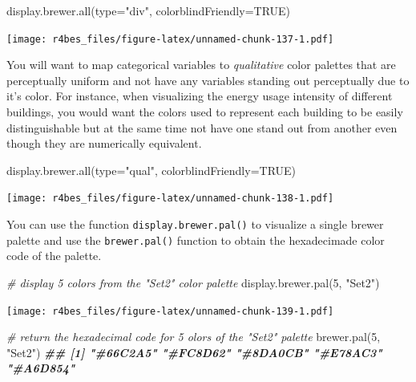 \documentclass[
]{book}
\newenvironment{Shaded}{\begin{snugshade}}{\end{snugshade}}
\newcommand{\AttributeTok}[1]{\textcolor[rgb]{0.77,0.63,0.00}{#1}}
\newcommand{\CommentTok}[1]{\textcolor[rgb]{0.56,0.35,0.01}{\textit{#1}}}
\newcommand{\ConstantTok}[1]{\textcolor[rgb]{0.00,0.00,0.00}{#1}}
\newcommand{\DecValTok}[1]{\textcolor[rgb]{0.00,0.00,0.81}{#1}}
\newcommand{\DocumentationTok}[1]{\textcolor[rgb]{0.56,0.35,0.01}{\textbf{\textit{#1}}}}
\newcommand{\FunctionTok}[1]{\textcolor[rgb]{0.00,0.00,0.00}{#1}}
\newcommand{\NormalTok}[1]{#1}
\newcommand{\StringTok}[1]{\textcolor[rgb]{0.31,0.60,0.02}{#1}}
\begin{document}
\begin{Shaded}
\begin{Highlighting}[]
\FunctionTok{display.brewer.all}\NormalTok{(}\AttributeTok{type=}\StringTok{"div"}\NormalTok{, }\AttributeTok{colorblindFriendly=}\ConstantTok{TRUE}\NormalTok{)}
\end{Highlighting}
\end{Shaded}

\texttt{[image: r4bes\_files/figure-latex/unnamed-chunk-137-1.pdf]}

You will want to map categorical variables to \emph{qualitative} color palettes that are perceptually uniform and not have any variables standing out perceptually due to it's color. For instance, when visualizing the energy usage intensity of different buildings, you would want the colors used to represent each building to be easily distinguishable but at the same time not have one stand out from another even though they are numerically equivalent.

\begin{Shaded}
\begin{Highlighting}[]
\FunctionTok{display.brewer.all}\NormalTok{(}\AttributeTok{type=}\StringTok{"qual"}\NormalTok{, }\AttributeTok{colorblindFriendly=}\ConstantTok{TRUE}\NormalTok{) }
\end{Highlighting}
\end{Shaded}

\texttt{[image: r4bes\_files/figure-latex/unnamed-chunk-138-1.pdf]}

You can use the function \texttt{display.brewer.pal()} to visualize a single brewer palette and use the \texttt{brewer.pal()} function to obtain the hexadecimade color code of the palette.

\begin{Shaded}
\begin{Highlighting}[]
\CommentTok{\# display 5 colors from the "Set2" color palette}
\FunctionTok{display.brewer.pal}\NormalTok{(}\DecValTok{5}\NormalTok{, }\StringTok{"Set2"}\NormalTok{)}
\end{Highlighting}
\end{Shaded}

\texttt{[image: r4bes\_files/figure-latex/unnamed-chunk-139-1.pdf]}

\begin{Shaded}
\begin{Highlighting}[]
\CommentTok{\# return the hexadecimal code for 5 olors of the "Set2" palette}
\FunctionTok{brewer.pal}\NormalTok{(}\DecValTok{5}\NormalTok{, }\StringTok{"Set2"}\NormalTok{)}
\DocumentationTok{\#\# [1] "\#66C2A5" "\#FC8D62" "\#8DA0CB" "\#E78AC3" "\#A6D854"}
\end{Highlighting}
\end{Shaded}
\end{document}
